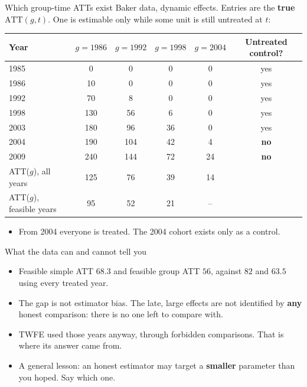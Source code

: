 \documentclass[
  11pt,
  ignorenonframetext,
  aspectratio=169,
]{beamer}
\providecommand{\tightlist}{%
  \setlength{\itemsep}{0pt}\setlength{\parskip}{0pt}}
\begin{document}
\begin{frame}{Which group-time ATTs exist}
\protect{}\label{which-group-time-atts-exist}
Baker data, dynamic effects. Entries are the \textbf{true}
\(\text{ATT}(g,t)\). One is estimable only while some unit is still
untreated at \(t\):

\begin{center}\scriptsize
\begin{tabular}{lccccc}
\toprule
Year & $g = 1986$ & $g = 1992$ & $g = 1998$ & $g = 2004$ & Untreated control? \\
\midrule
1985 & 0 & 0 & 0 & 0 & yes \\
1986 & 10 & 0 & 0 & 0 & yes \\
1992 & 70 & 8 & 0 & 0 & yes \\
1998 & 130 & 56 & 6 & 0 & yes \\
2003 & 180 & 96 & 36 & 0 & yes \\
2004 & 190 & 104 & 42 & 4 & \textbf{no} \\
2009 & 240 & 144 & 72 & 24 & \textbf{no} \\
\midrule
ATT($g$), all years & 125 & 76 & 39 & 14 & \\
ATT($g$), feasible years & 95 & 52 & 21 & -- & \\
\bottomrule
\end{tabular}
\end{center}

\begin{itemize}
\tightlist
\item
  From 2004 everyone is treated. The 2004 cohort exists only as a
  control.
\end{itemize}
\end{frame}

\begin{frame}{What the data can and cannot tell you}
\protect{}\label{what-the-data-can-and-cannot-tell-you}
\begin{itemize}
\tightlist
\item
  Feasible simple ATT \(68.3\) and feasible group ATT \(56\), against
  \(82\) and \(63.5\) using every treated year.
\item
  The gap is not estimator bias. The late, large effects are not
  identified by \textbf{any} honest comparison: there is no one left to
  compare with.
\item
  TWFE used those years anyway, through forbidden comparisons. That is
  where its answer came from.
\end{itemize}

\vspace{0.4em}

\begin{itemize}
\tightlist
\item
  A general lesson: an honest estimator may target a \textbf{smaller}
  parameter than you hoped. Say which one.
\end{itemize}
\end{frame}
\end{document}
